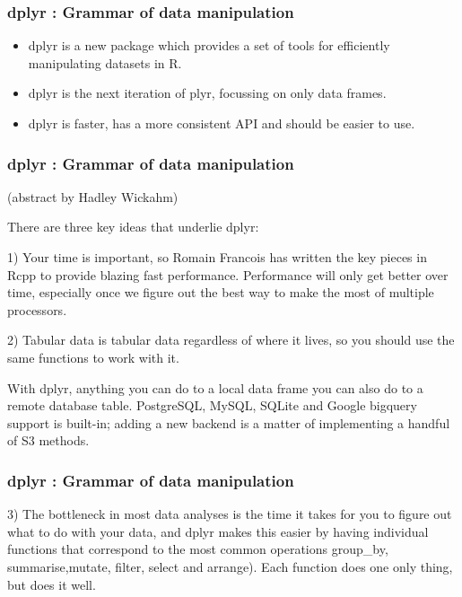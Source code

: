 \documentclass{beamer}
\begin{document}
\begin{frame}
\frametitle{dplyr : Grammar of data manipulation}
	\begin{itemize}
\item dplyr is a new package which provides a set of tools for efficiently manipulating datasets in R.
\item dplyr is the next iteration of plyr, focussing on only data frames. \item dplyr is faster, has a more consistent API and should be easier to use. 
	\end{itemize}


\end{frame}
\begin{frame}
\frametitle{dplyr : Grammar of data manipulation}
(abstract by Hadley Wickahm)

There are three key ideas that underlie dplyr:

1) Your time is important, so Romain Francois has written the key pieces in Rcpp to provide blazing fast performance. Performance will only get better over time, especially once we figure out the best way to make the most of multiple processors. 

\end{frame}
\begin{frame}
2) Tabular data is tabular data regardless of where it lives, so you should use the same functions to work with it. 

With dplyr, anything you can do to a local data frame you can also do to a remote database table. PostgreSQL, MySQL, SQLite and Google bigquery support is built-in; adding a new backend is a matter of implementing a handful of S3 methods. 
\end{frame}
\begin{frame}
\frametitle{dplyr : Grammar of data manipulation}
3) The bottleneck in most data analyses is the time it takes for you to figure out what to do with your data, and dplyr makes this easier by having individual functions that correspond to the most common operations  group\_by, summarise,mutate, filter, select and arrange). Each function does one only thing, but does it well.

\end{frame}	
	
\end{document}
